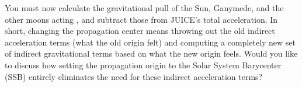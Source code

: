 \markdownRendererUlItem You must now calculate the gravitational pull of the Sun, Ganymede, and the other moons acting , and subtract those from JUICE's total acceleration.\markdownRendererUlItemEnd 
\markdownRendererUlEnd \markdownRendererInterblockSeparator
{}In short, changing the propagation center means throwing out the old indirect acceleration terms (what the old origin felt) and computing a completely new set of indirect gravitational terms based on what the new origin feels.\markdownRendererInterblockSeparator
{}\markdownRendererThematicBreak{}\markdownRendererInterblockSeparator
{}Would you like to discuss how setting the propagation origin to the Solar System Barycenter (SSB) entirely eliminates the need for these indirect acceleration terms?\markdownRendererInterblockSeparator
{}\markdownRendererThematicBreak{}\markdownRendererInterblockSeparator
{}
\markdownRendererSectionEnd 
\markdownRendererSectionEnd \markdownRendererSectionBegin
{}\markdownRendererInterblockSeparator
